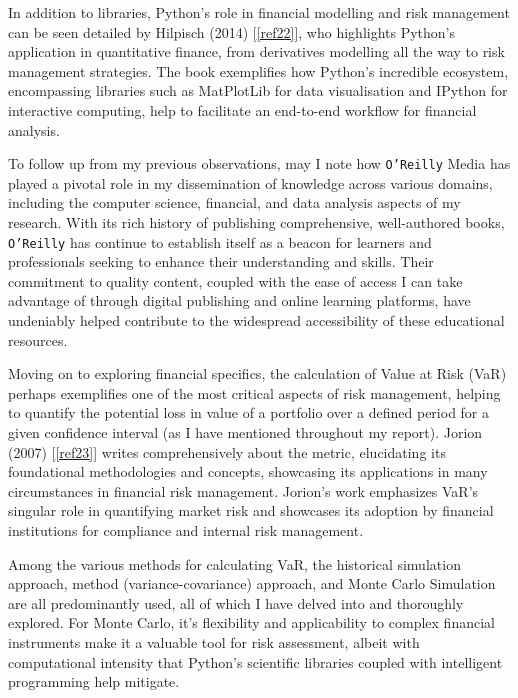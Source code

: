 \documentclass{article}
\begin{document}
In addition to libraries, Python's role in financial modelling and risk management can be seen detailed by Hilpisch (2014) [\ref{ref22}], who highlights Python's application in quantitative finance, from derivatives modelling all the way to risk management strategies. The book exemplifies how Python's incredible ecosystem, encompassing libraries such as MatPlotLib for data visualisation and IPython for interactive computing, help to facilitate an end-to-end workflow for financial analysis.\\\vspace{0.3cm}

To follow up from my previous observations, may I note how \texttt{O'Reilly} Media has played a pivotal role in my dissemination of knowledge across various domains, including the computer science, financial, and data analysis aspects of my research. With its rich history of publishing comprehensive, well-authored books, \texttt{O'Reilly} has continue to establish itself as a beacon for learners and professionals seeking to enhance their understanding and skills. Their commitment to quality content, coupled with the ease of access I can take advantage of through digital publishing and online learning platforms, have undeniably helped contribute to the widespread accessibility of these educational resources.\\\vspace{0.3cm}

Moving on to exploring financial specifics, the calculation of Value at Risk (VaR) perhaps exemplifies one of the most critical aspects of risk management, helping to quantify the potential loss in value of a portfolio over a defined period for a given confidence interval (as I have mentioned throughout my report). Jorion (2007) [\ref{ref23}] writes comprehensively about the metric, elucidating its foundational methodologies and concepts, showcasing its applications in many circumstances in financial risk management. Jorion's work emphasizes VaR's singular role in quantifying market risk and showcases its adoption by financial institutions for compliance and internal risk management.\\\vspace{0.3cm}

Among the various methods for calculating VaR, the historical simulation approach, method (variance-covariance) approach, and Monte Carlo Simulation are all predominantly used, all of which I have delved into and thoroughly explored. For Monte Carlo, it's flexibility and applicability to complex financial instruments make it a valuable tool for risk assessment, albeit with computational intensity that Python's scientific libraries coupled with intelligent programming help mitigate.\\\vspace{0.3cm}
\end{document}

